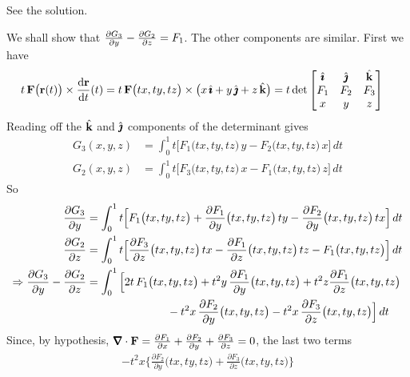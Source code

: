 
\begin{answer} 
See the solution.
\end{answer}

\begin{solution} 
We shall show that $\pdiff{G_3}{y}-\pdiff{G_2}{z}=F_1$. The other components
are similar. First we have
\begin{align*}
t\,\vF\big(\vr(t)\big)\times\diff{\vr}{t}(t)
&=t\,\vF\big(tx,ty,tz\big)\times\big(x\,\hi+y\,\hj+z\,\hk\big)
=t\det\left[\begin{matrix}\hi  & \hj & \hk \\
                     F_1 & F_2 & F_3\\
                     x & y & z\end{matrix}\right]
\end{align*}
Reading off the $\hat{\mathbf{k}}$ and $\hat{\pmb{\jmath}}$ components of the determinant
gives
\begin{align*}
G_3(x,y,z)&=\int_0^1 t\big[F_1\big(tx,ty,tz\big)\,y-F_2\big(tx,ty,tz\big)\,x\big]\,dt\\
G_2(x,y,z)&=\int_0^1 t\big[F_3\big(tx,ty,tz\big)\,x-F_1\big(tx,ty,tz\big)\,z\big]\,dt
\end{align*}
So
\begin{align*}
\pdiff{G_3}{y}
&=\int_0^1 t\Big[F_1\big(tx,ty,tz\big)+
\frac{\partial F_1}{\partial y}\big(tx,ty,tz\big)\,ty
-\frac{\partial F_2}{\partial y}\big(tx,ty,tz\big)\,tx\Big]\,dt\\
\pdiff{G_2}{z}&=\int_0^1 t\Big[
\frac{\partial F_3}{\partial z}\big(tx,ty,tz\big)\,tx
-\frac{\partial F_1}{\partial z}\big(tx,ty,tz\big)\,tz
-F_1\big(tx,ty,tz\big)\Big]\,dt\\
\Rightarrow
\pdiff{G_3}{y}-\pdiff{G_2}{z}
&=\int_0^1 \Big[2t\,F_1\big(tx,ty,tz\big)+
t^2y\,\frac{\partial F_1}{\partial y}\big(tx,ty,tz\big)
+t^2z\frac{\partial F_1}{\partial z}\big(tx,ty,tz\big)\\
&\hskip1in
-t^2x\,\frac{\partial F_2}{\partial y}\big(tx,ty,tz\big)
-t^2x\,\frac{\partial F_3}{\partial z}\big(tx,ty,tz\big)\Big]\,dt
\end{align*}
Since, by hypothesis, 
   $\vnabla\cdot\vF=\frac{\partial F_1}{\partial x}
   +\frac{\partial F_2}{\partial y}
   +\frac{\partial F_3}{\partial z}=0$, the last two terms
\begin{align*}
-t^2x\Big\{\frac{\partial F_2}{\partial y}\big(tx,ty,tz\big)
+\frac{\partial F_3}{\partial z}\big(tx,ty,tz\big)\Big\}

\end{align*}
\end{solution}
